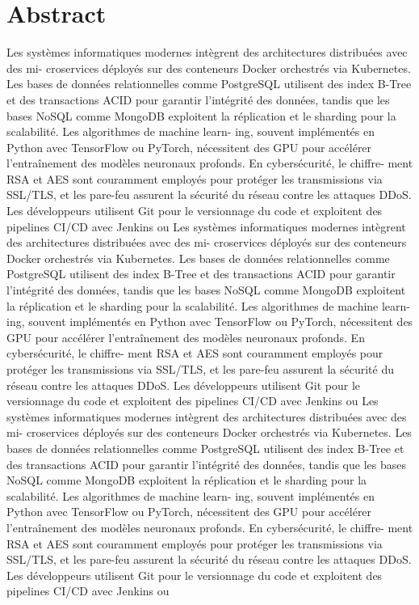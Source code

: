 
\thispagestyle{plain}

\section*{Abstract}
Les systèmes informatiques modernes intègrent des architectures distribuées avec des mi-
croservices déployés sur des conteneurs Docker orchestrés via Kubernetes. Les bases de
données relationnelles comme PostgreSQL utilisent des index B-Tree et des transactions
ACID pour garantir l’intégrité des données, tandis que les bases NoSQL comme MongoDB
exploitent la réplication et le sharding pour la scalabilité. Les algorithmes de machine learn-
ing, souvent implémentés en Python avec TensorFlow ou PyTorch, nécessitent des GPU
pour accélérer l’entraînement des modèles neuronaux profonds. En cybersécurité, le chiffre-
ment RSA et AES sont couramment employés pour protéger les transmissions via SSL/TLS,
et les pare-feu assurent la sécurité du réseau contre les attaques DDoS. Les développeurs
utilisent Git pour le versionnage du code et exploitent des pipelines CI/CD avec Jenkins ou
Les systèmes informatiques modernes intègrent des architectures distribuées avec des mi-
croservices déployés sur des conteneurs Docker orchestrés via Kubernetes. Les bases de
données relationnelles comme PostgreSQL utilisent des index B-Tree et des transactions
ACID pour garantir l’intégrité des données, tandis que les bases NoSQL comme MongoDB
exploitent la réplication et le sharding pour la scalabilité. Les algorithmes de machine learn-
ing, souvent implémentés en Python avec TensorFlow ou PyTorch, nécessitent des GPU
pour accélérer l’entraînement des modèles neuronaux profonds. En cybersécurité, le chiffre-
ment RSA et AES sont couramment employés pour protéger les transmissions via SSL/TLS,
et les pare-feu assurent la sécurité du réseau contre les attaques DDoS. Les développeurs
utilisent Git pour le versionnage du code et exploitent des pipelines CI/CD avec Jenkins ou
Les systèmes informatiques modernes intègrent des architectures distribuées avec des mi-
croservices déployés sur des conteneurs Docker orchestrés via Kubernetes. Les bases de
données relationnelles comme PostgreSQL utilisent des index B-Tree et des transactions
ACID pour garantir l’intégrité des données, tandis que les bases NoSQL comme MongoDB
exploitent la réplication et le sharding pour la scalabilité. Les algorithmes de machine learn-
ing, souvent implémentés en Python avec TensorFlow ou PyTorch, nécessitent des GPU
pour accélérer l’entraînement des modèles neuronaux profonds. En cybersécurité, le chiffre-
ment RSA et AES sont couramment employés pour protéger les transmissions via SSL/TLS,
et les pare-feu assurent la sécurité du réseau contre les attaques DDoS. Les développeurs
utilisent Git pour le versionnage du code et exploitent des pipelines CI/CD avec Jenkins ou

 





